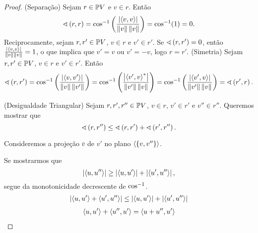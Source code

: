 \begin{proof}
\begin{comment}
\end{comment}
(Separação) Sejam $r \in \pro V$ e $v \in r$. Então
	\begin{equation*}
	\ang{r}{r} = \cos\inv \left( \frac{\abs{\inte{v}{v}}}{\nor{v}\nor{v}} \right) = \cos\inv (1) = 0.
	\end{equation*}
Reciprocamente, sejam $r,r' \in \pro V$, $v \in r$ e $v' \in r'$. Se $\ang{r}{r'} = 0$, então $\frac{\abs{\inte{v}{v}}}{\nor{v}\nor{v}}= 1$, o que implica que $v'=v$ ou $v'=-v$, logo $r=r'$.
(Simetria) Sejam $r,r' \in \pro V$, $v \in r$ e $v' \in r'$. Então
	\begin{equation*}
	\ang{r}{r'} = \cos\inv \left( \frac{\abs{\inte{v}{v'}}}{\nor{v}\nor{v'}} \right) = \cos\inv \left( \frac{\abs{\conju{\inte{v'}{v}}}}{\nor{v'}\nor{v}} \right) = \cos\inv \left( \frac{\abs{\inte{v'}{v}}}{\nor{v'}\nor{v}} \right) = \ang{r'}{r}.
	\end{equation*}

(Desigualdade Triangular) Sejam $r,r',r'' \in \pro V$, $v \in r$, $v' \in r'$ e $v'' \in r''$. Queremos mostrar que
	\begin{equation*}
	\ang{r}{r''} \leq \ang{r}{r'} + \ang{r'}{r''}.
	\end{equation*}
%

Consideremos a projeção $\bar v$ de $v'$ no plano $\ger{\{v,v''\}}$.

Se mostrarmos que
	\begin{equation*}
	\abs{\inte{u}{u''}} \geq \abs{\inte{u}{u'}} + \abs{\inte{u'}{u''}},
	\end{equation*}
segue da monotonicidade decrescente de $\cos\inv$.
	\begin{align*}
	\abs{\inte{u}{u'}+\inte{u'}{u''}} \leq \abs{\inte{u}{u'}} + \abs{\inte{u'}{u''}}
	\end{align*}
	\begin{align*}
	\inte{u}{u'}+\inte{u''}{u'} = \inte{u+u''}{u'}
	\end{align*}
\end{proof}

